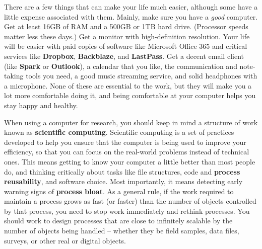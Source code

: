 There are a few things that can make your life much easier,
although some have a little expense associated with them.
Mainly, make sure you have a \textit{good} computer.
Get at least 16GB of RAM and a 500GB or 1TB hard drive.
(Processor speeds matter less these days.)
Get a monitor with high-definition resolution.
Your life will be easier with paid copies of software like Microsoft Office 365
and critical services like \textbf{Dropbox}, \textbf{Backblaze}, and \textbf{LastPass}.
Get a decent email client (like \textbf{Spark} or \textbf{Outlook}),
a calendar that you like, the communication and note-taking tools you need,
a good music streaming service, and solid headphones with a microphone.
None of these are essential to the work,
but they will make you a lot more comfortable doing it,
and being comfortable at your computer helps you stay happy and healthy.

When using a computer for research,
you should keep in mind a structure of work
known as \textbf{scientific computing}.\cite{wilson2014best,wilson2017good}
Scientific computing is a set of practices developed to help you
ensure that the computer is being used to improve your efficiency,
so that you can focus on the real-world problems instead of technical ones.
This means getting to know your computer a little better than most people do,
and thinking critically about tasks like file structures,
code and \textbf{process reusability},
and software choice. Most importantly,
it means detecting early warning signs of \textbf{process bloat}.
As a general rule, if the work required to maintain a process
grows as fast (or faster) than the number of objects controlled by that process,
you need to stop work immediately and rethink processes.
You should work to design processes that are
close to infinitely scalable by the number of objects being handled --
whether they be field samples, data files, surveys, or other real or digital objects.

